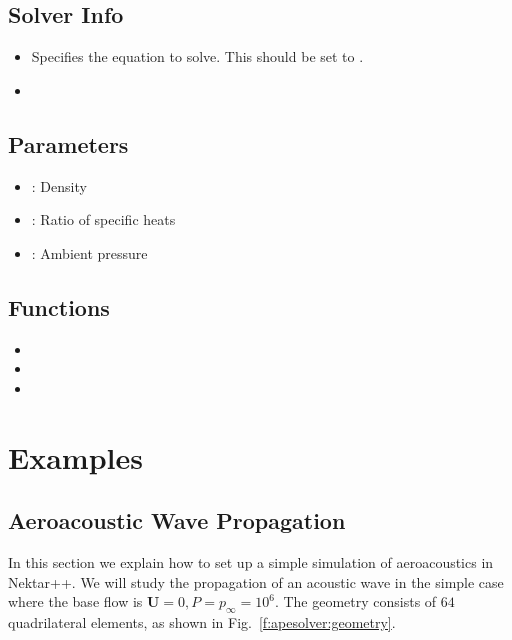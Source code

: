\subsection{Solver Info}
\begin{itemize}
\item {} Specifies the equation to solve. This should be set to
.
\item {}
\end{itemize}

\subsection{Parameters}
\begin{itemize}
\item {}: Density
\item {}: Ratio of specific heats
\item {}: Ambient pressure
\end{itemize}

\subsection{Functions}
\begin{itemize}
\item {}
\item {}
\item {}
\end{itemize}


\section{Examples}
\subsection{Aeroacoustic Wave Propagation}
In this section we explain how to set up a simple simulation of aeroacoustics in
Nektar++. We will study the propagation of an acoustic wave in the simple case
where the base flow is $\mathbf{U}=0, P=p_{\infty}=10^6$. The geometry consists
of $64$ quadrilateral elements, as shown in Fig.~\ref{f:apesolver:geometry}.

